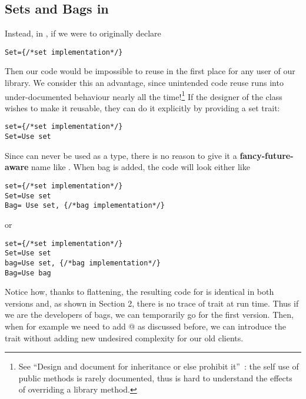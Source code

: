 \subsection{Sets and Bags in \name}
Instead, in \name, if we were to originally declare
\saveSpace\saveSpace\begin{lstlisting}
Set={/*set implementation*/} 
\end{lstlisting}\saveSpace\saveSpace
Then our code would be impossible to reuse in the first place for any user of our library.
We consider this an advantage, since unintended code reuse runs into under-documented behaviour nearly all the time!\footnote{See
``Design and document for inheritance or else prohibit
it''~\cite{Bloch08}: the
self use of public methods is rarely documented, thus is hard to understand the effects of overriding a library method.
}
If the designer of the \Q@Set@ class wishes to make it reusable, they can do it explicitly by providing a set trait:
\saveSpace\saveSpace\begin{lstlisting}
set={/*set implementation*/} 
Set=Use set
\end{lstlisting}\saveSpace\saveSpace
Since \Q@set@ can never be used as a type, there is no reason to give it a {\bf fancy-future-aware} name like
\Q@AbstractSetOrBag@.
When bag is added, the code will look either like
\saveSpace\saveSpace\begin{lstlisting}
set={/*set implementation*/} 
Set=Use set
Bag= Use set, {/*bag implementation*/}
\end{lstlisting}\saveSpace\saveSpace
or 
\saveSpace\saveSpace\begin{lstlisting}
set={/*set implementation*/} 
Set=Use set
bag=Use set, {/*bag implementation*/}
Bag=Use bag
\end{lstlisting}\saveSpace
Notice how, thanks to flattening, the resulting code for \Q@Bag@ is identical in both versions
and, as shown in Section 2, there is no trace of trait \Q@bag@ at run time. 
Thus if we are the developers of bags, we can temporarily go for the first version.
Then, when for example we need to add @ as discussed before,
we can introduce the \Q@bag@ trait without adding new undesired complexity for our old clients.

